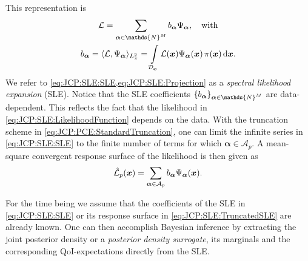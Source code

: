 This representation is
\begin{gather}
  \mathcal{L} = \sum\limits_{\bm{\alpha} \in \mathds{N}^\dimParam} \coeffL_{\bm{\alpha}} \basis_{\bm{\alpha}}, \quad \text{with} \label{eq:JCP:SLE:SLE} \\
  \coeffL_{\bm{\alpha}}
  = \langle \mathcal{L}, \basis_{\bm{\alpha}} \rangle_{L_{\pi}^2}
  = \int\limits_{\mathcal{D}_{\bm{x}}} \mathcal{L}(\bm{x}) \basis_{\bm{\alpha}}(\bm{x}) \, \pi(\bm{x}) \, \mathrm{d} \bm{x}. \label{eq:JCP:SLE:Projection}
\end{gather}
We refer to \cref{eq:JCP:SLE:SLE,eq:JCP:SLE:Projection} as a \emph{spectral likelihood expansion} (SLE).
Notice that the SLE coefficients \(\{\coeffL_{\bm{\alpha}}\}_{\bm{\alpha} \in \mathds{N}^\dimParam}\) are data-dependent.
This reflects the fact that the likelihood in \cref{eq:JCP:SLE:LikelihoodFunction} depends on the data.
With the truncation scheme in \cref{eq:JCP:PCE:StandardTruncation}, one can limit the infinite series in \cref{eq:JCP:SLE:SLE} to the finite number of terms for which \(\bm{\alpha} \in \mathcal{A}_p\).
A mean-square convergent response surface of the likelihood is then given as
\begin{equation} \label{eq:JCP:SLE:TruncatedSLE}
  \hat{\mathcal{L}}_p(\bm{x}) = \sum\limits_{\bm{\alpha} \in \mathcal{A}_p} b_{\bm{\alpha}} \Psi_{\bm{\alpha}}(\bm{x}).
\end{equation}
\par %
For the time being we assume that the coefficients of the SLE in \cref{eq:JCP:SLE:SLE} or its response surface in \cref{eq:JCP:SLE:TruncatedSLE} are already known.
One can then accomplish Bayesian inference by extracting the joint posterior density or a \emph{posterior density surrogate},
its marginals and the corresponding QoI-expectations directly from the SLE.


